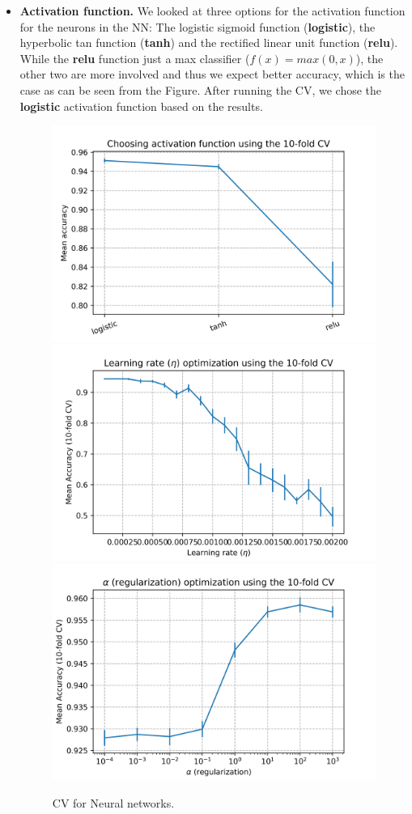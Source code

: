 \documentclass[10pt]{scrartcl}
\begin{document}
\begin{itemize}
\item{\textbf{Activation function.}} We looked at three options for the activation function for the neurons in the NN: The logistic sigmoid function (\textbf{logistic}), the hyperbolic tan function (\textbf{tanh}) and the rectified linear unit function (\textbf{relu}). While the \textbf{relu} function just a max classifier ($f(x)=max(0,x)$), the other two are more involved and thus we expect better accuracy, which is the case as can be seen from the Figure. After running the CV, we chose the \textbf{logistic} activation function based on the results.

\begin{figure}[H]
\centering
\includegraphics[width=0.5\linewidth]{figures/Neural_net_act_fcn_mean_acc_error_bar.png}%
\includegraphics[width=0.5\linewidth]{figures/Neural_net_learn_rate_mean_acc_error_bar.png} %
\linebreak 
\includegraphics[width=0.5\linewidth]{figures/Neural_net_alpha_mean_acc_error_bar.png}
\caption{CV for Neural networks. \label{fig:nn_cv}}
\end{figure}


\end{itemize}
\end{document}
